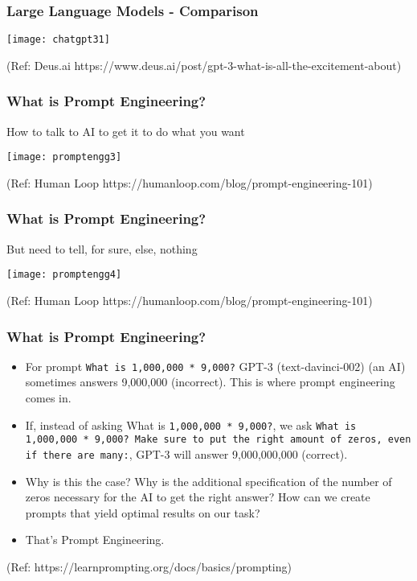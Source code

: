 \begin{frame}[fragile]\frametitle{Large Language Models - Comparison}

\begin{center}
\texttt{[image: chatgpt31]}
\end{center}				
{\tiny (Ref: Deus.ai https://www.deus.ai/post/gpt-3-what-is-all-the-excitement-about)}

\end{frame}

\begin{frame}[fragile]\frametitle{What is Prompt Engineering?}

How to talk to AI to get it to do what you want


\begin{center}
\texttt{[image: promptengg3]}

{\tiny (Ref: Human Loop https://humanloop.com/blog/prompt-engineering-101)}

\end{center}				
			

\end{frame}

\begin{frame}[fragile]\frametitle{What is Prompt Engineering?}

But need to tell, for sure, else, nothing


\begin{center}
\texttt{[image: promptengg4]}

{\tiny (Ref: Human Loop https://humanloop.com/blog/prompt-engineering-101)}

\end{center}				

\end{frame}


\begin{frame}[fragile]\frametitle{What is Prompt Engineering?}

\begin{itemize}
\item For prompt \lstinline|What is 1,000,000 * 9,000?| GPT-3 (text-davinci-002) (an AI) sometimes answers 9,000,000 (incorrect). This is where prompt engineering comes in.
\item If, instead of asking What is \lstinline|1,000,000 * 9,000?|, we ask \lstinline|What is 1,000,000 * 9,000? Make sure to put the right amount of zeros, even if there are many:|, GPT-3 will answer 9,000,000,000 (correct). 
\item Why is this the case? Why is the additional specification of the number of zeros necessary for the AI to get the right answer? How can we create prompts that yield optimal results on our task? 			
\item That's Prompt Engineering.
\end{itemize}

{\tiny (Ref: https://learnprompting.org/docs/basics/prompting)}
\end{frame}

